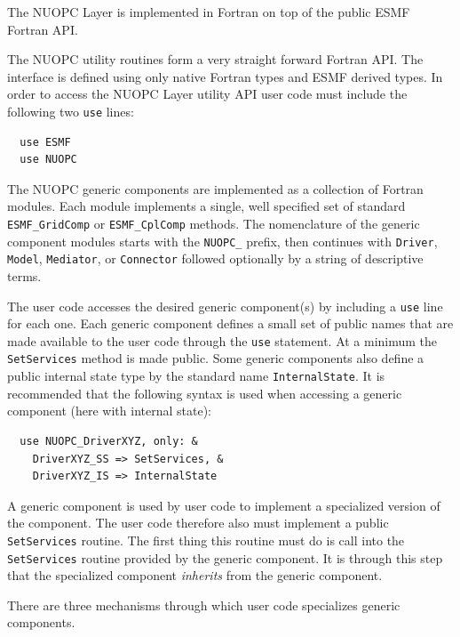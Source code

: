 
The NUOPC Layer is implemented in Fortran on top of the public ESMF Fortran API.

The NUOPC utility routines form a very straight forward Fortran API. The interface is defined using only native Fortran types and ESMF derived types. In order to access the NUOPC Layer utility API user code must include the following two {\tt use} lines:

\begin{verbatim}
  use ESMF
  use NUOPC
\end{verbatim}

The NUOPC generic components are implemented as a collection of Fortran modules. Each module implements a single, well specified set of standard {\tt ESMF\_GridComp} or {\tt ESMF\_CplComp} methods. The nomenclature of the generic component modules starts with the {\tt NUOPC\_} prefix, then continues with {\tt Driver}, {\tt Model}, {\tt Mediator}, or {\tt Connector} followed optionally by a string of descriptive terms.

The user code accesses the desired generic component(s) by including a {\tt use} line for each one. Each generic component defines a small set of public names that are made available to the user code through the {\tt use} statement. At a minimum the {\tt SetServices} method is made public. Some generic components also define a public internal state type by the standard name {\tt InternalState}. It is recommended that the following syntax is used when accessing a generic component (here with internal state):

\begin{verbatim}
  use NUOPC_DriverXYZ, only: &
    DriverXYZ_SS => SetServices, &
    DriverXYZ_IS => InternalState
\end{verbatim}

A generic component is used by user code to implement a specialized version of the component. The user code therefore also must implement a public {\tt SetServices} routine. The first thing this routine must do is call into the {\tt SetServices} routine provided by the generic component. It is through this step that the specialized component {\em inherits} from the generic component.

There are three mechanisms through which user code specializes generic components.


